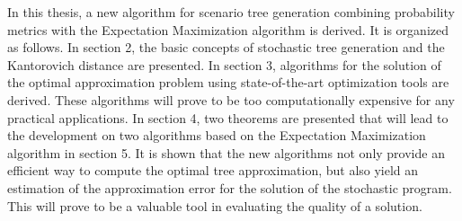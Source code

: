 In this thesis, a new algorithm for scenario tree generation combining probability metrics with the Expectation Maximization algorithm \citep{Dempster1977} is derived.
It is organized as follows.
In section 2, the basic concepts of stochastic tree generation and the Kantorovich distance are presented.
In section 3, algorithms for the solution of the optimal approximation problem using state-of-the-art optimization tools are derived.
These algorithms will prove to be too computationally expensive for any practical applications.
In section 4, two theorems are presented that will lead to the development on two algorithms based on the Expectation Maximization algorithm in section 5.
It is shown that the new algorithms not only provide an efficient way to compute the optimal tree approximation, but also yield an estimation of the approximation error for the solution of the stochastic program.
This will prove to be a valuable tool in evaluating the quality of a solution.
